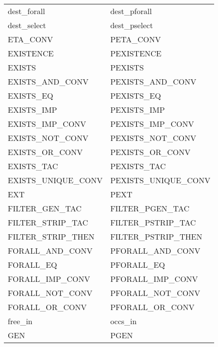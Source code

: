{\begin{center}
\begin{tabular}[t]{|l|l|}
        dest\_forall                &   dest\_pforall               \\
        dest\_select                &   dest\_pselect               \\
        ETA\_CONV                   &   PETA\_CONV                  \\
        EXISTENCE                   &   PEXISTENCE                  \\
        EXISTS                      &   PEXISTS                     \\
        EXISTS\_AND\_CONV           &   PEXISTS\_AND\_CONV          \\
        EXISTS\_EQ                  &   PEXISTS\_EQ                 \\
        EXISTS\_IMP                 &   PEXISTS\_IMP                \\
        EXISTS\_IMP\_CONV           &   PEXISTS\_IMP\_CONV          \\
        EXISTS\_NOT\_CONV           &   PEXISTS\_NOT\_CONV          \\
        EXISTS\_OR\_CONV            &   PEXISTS\_OR\_CONV           \\
        EXISTS\_TAC                 &   PEXISTS\_TAC                \\
        EXISTS\_UNIQUE\_CONV        &   PEXISTS\_UNIQUE\_CONV       \\
        EXT                         &   PEXT                        \\
        FILTER\_GEN\_TAC            &   FILTER\_PGEN\_TAC           \\
        FILTER\_STRIP\_TAC          &   FILTER\_PSTRIP\_TAC         \\
        FILTER\_STRIP\_THEN         &   FILTER\_PSTRIP\_THEN        \\
        FORALL\_AND\_CONV           &   PFORALL\_AND\_CONV          \\
        FORALL\_EQ                  &   PFORALL\_EQ                 \\
        FORALL\_IMP\_CONV           &   PFORALL\_IMP\_CONV          \\
        FORALL\_NOT\_CONV           &   PFORALL\_NOT\_CONV          \\
        FORALL\_OR\_CONV            &   PFORALL\_OR\_CONV           \\
        free\_in                    &   occs\_in                    \\
        GEN                         &   PGEN                        \\

\end{tabular}
\end{center}}
